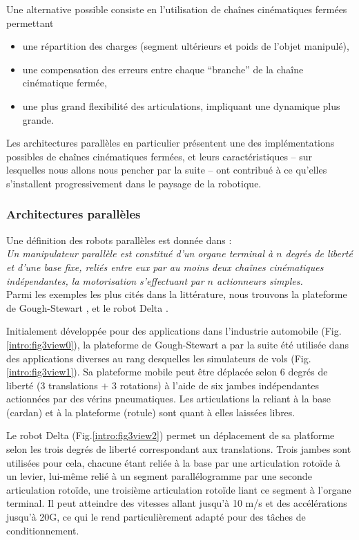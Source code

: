 Une alternative possible consiste en l'utilisation de chaînes cinématiques fermées permettant
\begin{itemize}
 \item une répartition des charges (segment ultérieurs et poids de l'objet manipulé),
 \item une compensation des erreurs entre chaque ``branche'' de la chaîne cinéma\-tique fermée,
 \item une plus grand flexibilité des articulations, impliquant une dynamique plus grande.
\end{itemize}

Les architectures parallèles en particulier présentent une des implémentations possibles de chaînes cinématiques fermées, et leurs caractéristiques -- sur lesquel\-les nous allons nous pencher par la suite -- ont contribué à ce qu'elles s'installent progressivement dans le paysage de la robotique.


\subsubsection{Architectures parallèles}

Une définition des robots parallèles est donnée dans \cite{merlet1997robots} :\\
{\it Un manipulateur parallèle est constitué d’un organe terminal à $n$ degrés de li\-berté et d’une base fixe, reliés entre eux par au moins deux chaînes
cinématiques indépendantes, la motorisation s’effectuant par $n$ actionneurs simples.}\\

Parmi les exemples les plus cités dans la littérature, nous trouvons la plateforme de Gough-Stewart \cite{1956:Gough}, \cite{1965:Stewart} et le robot Delta \cite{1988:Clavel}.

Initialement développée pour des applications dans l'industrie automobile (Fig.\ref{intro:fig3view0}), la plateforme de Gough-Stewart a par la suite été utilisée dans des applications diverses au rang desquelles les simulateurs de vols (Fig.\ref{intro:fig3view1}). Sa plateforme mobile peut être déplacée selon 6 degrés de liberté (3 translations $+$ 3 rotations) à l'aide de six jambes indépendantes actionnées par des vérins pneumatiques. Les articulations la reliant à la base (cardan) et à la plateforme (rotule) sont quant à elles laissées libres.

Le robot Delta (Fig.\ref{intro:fig3view2}) permet un déplacement de sa platforme selon les trois degrés de liberté correspondant aux translations. Trois jambes sont utilisées pour cela, chacune étant reliée à la base par une articulation rotoïde à un levier, lui-même relié à un segment parallélogramme par une seconde articulation rotoïde, une troisième articulation rotoïde liant ce segment à l'organe terminal. Il peut atteindre des vitesses allant jusqu'à 10 m/s et des accélérations jusqu'à 20G, ce qui le rend particulièrement adapté pour des tâches de conditionnement. 

